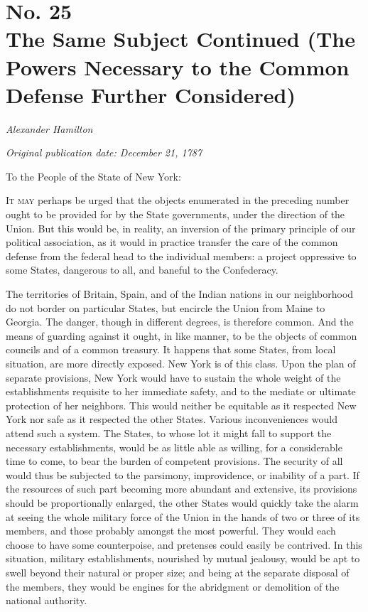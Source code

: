 \chapter[No. 25: The Same Subject Continued (The Powers Necessary to the Common Defense Further Considered)]{No. 25\\ {\small The Same Subject Continued (The Powers Necessary to the Common Defense Further Considered)}}

\textit{Alexander Hamilton}

\textit{Original publication date: December 21, 1787}
\vspace{1cm}

To the People of the State of New York:
\vspace{.4cm}

\textsc{It may} perhaps be urged that the objects enumerated in the preceding number ought to be provided for by the State governments, under the direction of the Union. 
But this would be, in reality, an inversion of the primary principle of our political association, as it would in practice transfer the care of the common defense from the federal head to the individual members: a project oppressive to some States, dangerous to all, and baneful to the Confederacy.

The territories of Britain, Spain, and of the Indian nations in our neighborhood do not border on particular States, but encircle the Union from Maine to Georgia. 
The danger, though in different degrees, is therefore common. 
And the means of guarding against it ought, in like manner, to be the objects of common councils and of a common treasury. 
It happens that some States, from local situation, are more directly exposed. 
New York is of this class. 
Upon the plan of separate provisions, New York would have to sustain the whole weight of the establishments requisite to her immediate safety, and to the mediate or ultimate protection of her neighbors. 
This would neither be equitable as it respected New York nor safe as it respected the other States. 
Various inconveniences would attend such a system. 
The States, to whose lot it might fall to support the necessary establishments, would be as little able as willing, for a considerable time to come, to bear the burden of competent provisions. 
The security of all would thus be subjected to the parsimony, improvidence, or inability of a part. 
If the resources of such part becoming more abundant and extensive, its provisions should be proportionally enlarged, the other States would quickly take the alarm at seeing the whole military force of the Union in the hands of two or three of its members, and those probably amongst the most powerful. 
They would each choose to have some counterpoise, and pretenses could easily be contrived. 
In this situation, military establishments, nourished by mutual jealousy, would be apt to swell beyond their natural or proper size; and being at the separate disposal of the members, they would be engines for the abridgment or demolition of the national authority.

